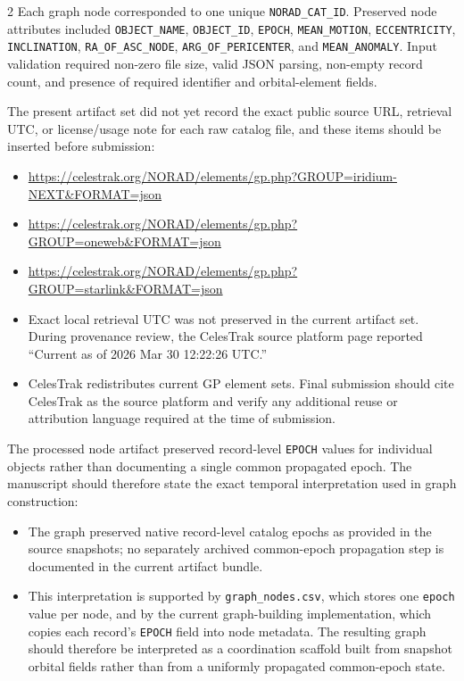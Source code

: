 \documentclass[fleqn,10pt,letterpaper]{article}
\begin{document}
\begin{multicols}{2}
Each graph node corresponded to one unique \texttt{NORAD\_CAT\_ID}. Preserved node attributes included \texttt{OBJECT\_NAME}, \texttt{OBJECT\_ID}, \texttt{EPOCH}, \texttt{MEAN\_MOTION}, \texttt{ECCENTRICITY}, \texttt{INCLINATION}, \texttt{RA\_OF\_ASC\_NODE}, \texttt{ARG\_OF\_PERICENTER}, and \texttt{MEAN\_ANOMALY}. Input validation required non-zero file size, valid JSON parsing, non-empty record count, and presence of required identifier and orbital-element fields.

The present artifact set did not yet record the exact public source URL, retrieval UTC, or license/usage note for each raw catalog file, and these items should be inserted before submission:

\begin{itemize}
\item \url{https://celestrak.org/NORAD/elements/gp.php?GROUP=iridium-NEXT&FORMAT=json}
\item \url{https://celestrak.org/NORAD/elements/gp.php?GROUP=oneweb&FORMAT=json}
\item \url{https://celestrak.org/NORAD/elements/gp.php?GROUP=starlink&FORMAT=json}
\item Exact local retrieval UTC was not preserved in the current artifact set. During provenance review, the CelesTrak source platform page reported ``Current as of 2026 Mar 30 12:22:26 UTC.''
\item CelesTrak redistributes current GP element sets. Final submission should cite CelesTrak as the source platform and verify any additional reuse or attribution language required at the time of submission.
\end{itemize}
The processed node artifact preserved record-level \texttt{EPOCH} values for individual objects rather than documenting a single common propagated epoch. The manuscript should therefore state the exact temporal interpretation used in graph construction:

\begin{itemize}
\item The graph preserved native record-level catalog epochs as provided in the source snapshots; no separately archived common-epoch propagation step is documented in the current artifact bundle.
\item This interpretation is supported by \texttt{graph\_nodes.csv}, which stores one \texttt{epoch} value per node, and by the current graph-building implementation, which copies each record's \texttt{EPOCH} field into node metadata. The resulting graph should therefore be interpreted as a coordination scaffold built from snapshot orbital fields rather than from a uniformly propagated common-epoch state.
\end{itemize}


\end{multicols}
\end{document}
